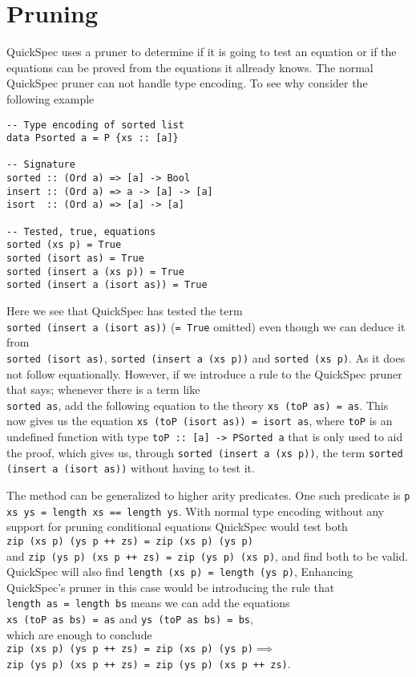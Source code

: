 \section{Pruning}
QuickSpec uses a pruner to determine if
it is going to test an equation or if the equations
can be proved from the equations it allready knows.
The normal QuickSpec pruner can not handle type encoding.
To see why consider the following example
\begin{verbatim}
-- Type encoding of sorted list
data Psorted a = P {xs :: [a]}

-- Signature
sorted :: (Ord a) => [a] -> Bool
insert :: (Ord a) => a -> [a] -> [a]
isort  :: (Ord a) => [a] -> [a]

-- Tested, true, equations
sorted (xs p) = True
sorted (isort as) = True
sorted (insert a (xs p)) = True
sorted (insert a (isort as)) = True
\end{verbatim}
Here we see that QuickSpec has tested the term
\\\texttt{sorted (insert a (isort as))} (\texttt{= True} omitted)
even though we can deduce it from
\\\texttt{sorted (isort as)},
\texttt{sorted (insert a (xs p))} and
\texttt{sorted (xs p)}. As it does not follow
equationally. However, if we introduce
a rule to the QuickSpec pruner that says;
whenever there is a term like \\\texttt{sorted as},
add the following equation to the theory
\texttt{xs (toP as) = as}. This now gives us
the equation \texttt{xs (toP (isort as)) = isort as},
where \texttt{toP} is an undefined function with type
\texttt{toP :: [a] -> PSorted a} that is only used to aid the proof,
which gives us, through \texttt{sorted (insert a (xs p))},
the term \texttt{sorted (insert a (isort as))} without
having to test it.

The method can be generalized to higher arity predicates.
One such predicate is \texttt{p xs ys = length xs == length ys}.
With normal type encoding without any support for pruning
conditional equations QuickSpec would test both
\\\texttt{zip (xs p) (ys p ++ zs) = zip (xs p) (ys p)}\\
and \texttt{zip (ys p) (xs p ++ zs) = zip (ys p) (xs p)}, and find
both to be valid.
QuickSpec will also find \texttt{length (xs p) = length (ys p)},
Enhancing QuickSpec's pruner in this case would be introducing
the rule that\\\texttt{length as = length bs} means we can add the equations
\\\texttt{xs (toP as bs) = as} and \texttt{ys (toP as bs) = bs},\\
which are enough to conclude\\
\texttt{zip (xs p) (ys p ++ zs) = zip (xs p) (ys p)}$\implies$
\\\texttt{zip (ys p) (xs p ++ zs) = zip (ys p) (xs p ++ zs)}.

